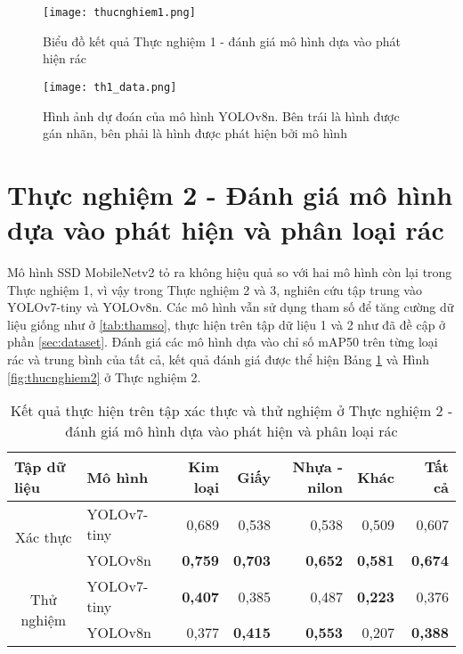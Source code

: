 \documentclass[../the.tex]{subfiles}
\begin{document}
\begin{figure}[H]
    \centering
    \texttt{[image: thucnghiem1.png]}
    \caption{Biểu đồ kết quả Thực nghiệm 1 - đánh giá mô hình dựa vào phát hiện rác}
    \label{fig:thucnghiem1}
\end{figure}


\begin{figure}[H]
    \centering
    \texttt{[image: th1\_data.png]}
    \caption{Hình ảnh dự đoán của mô hình YOLOv8n. Bên trái là hình được gán nhãn, bên phải là hình được phát hiện bởi mô hình}
    \label{fig:thucnghiem1.3}
\end{figure}

\section{Thực nghiệm 2 - Đánh giá mô hình dựa vào phát hiện và phân loại rác}

 {\fontsize{13}{12} \selectfont

  Mô hình SSD MobileNetv2 tỏ ra không hiệu quả so với hai mô hình còn lại trong Thực nghiệm 1, vì vậy trong Thực nghiệm 2 và 3, nghiên cứu tập trung vào YOLOv7-tiny và YOLOv8n. 
  Các mô hình vẫn sử dụng tham số để tăng cường dữ liệu giống như ở \ref{tab:thamso}, thực hiện trên tập dữ liệu 1 và 2 như đã đề cập ở phần \ref{sec:dataset}.
  Đánh giá các mô hình dựa vào chỉ số mAP50 trên từng loại rác và trung bình của tất cả, kết quả đánh giá được thể hiện Bảng \ref{tab:thucnghiem2.1} và Hình \ref{fig:thucnghiem2} ở Thực nghiệm 2.
 
  }

\bigskip


\begin{table}[h!]
    \centering
    \caption{Kết quả thực hiện trên tập xác thực và thử nghiệm ở Thực nghiệm 2 - đánh giá mô hình dựa vào phát hiện và phân loại rác}
    \begin{tabular}{|c|l|r|r|r|r|r|}
        \hline
        \multicolumn{1}{|l|}{\textbf{Tập dữ liệu}} & \textbf{Mô hình} & \textbf{Kim loại} & \textbf{Giấy}  & \textbf{Nhựa - nilon} & \textbf{Khác}  & \textbf{Tất cả} \\ \hline
        \multirow{2}{*}{Xác thực}                  & YOLOv7-tiny      & 0,689             & 0,538          & 0,538                 & 0,509          & 0,607           \\ \cline{2-7} 
                                                   & YOLOv8n          & \textbf{0,759}    & \textbf{0,703} & \textbf{0,652}        & \textbf{0,581} & \textbf{0,674}  \\ \hline
        \multirow{2}{*}{Thử nghiệm}                & YOLOv7-tiny      & \textbf{0,407}    & 0,385          & 0,487                 & \textbf{0,223} & 0,376           \\ \cline{2-7} 
                                                   & YOLOv8n          & 0,377             & \textbf{0,415} & \textbf{0,553}        & 0,207          & \textbf{0,388}  \\ \hline
        \end{tabular}
    \label{tab:thucnghiem2.1}
\end{table}
\end{document}
